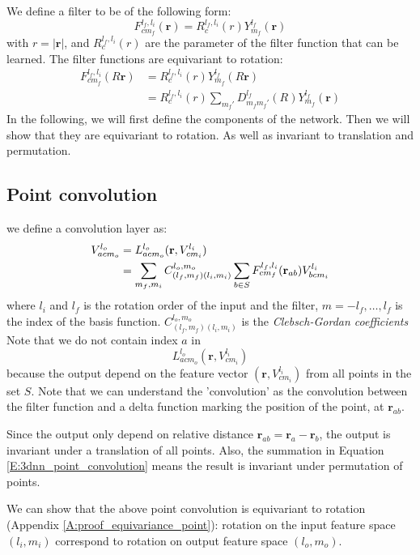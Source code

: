 \documentclass{article}
\begin{document}
We define a filter to be of the following form:
\begin{equation}
    F_{cm_f}^{l_f, l_i}(\mathbf{r}) =  R_c^{l_f, l_i} (r) Y_{m_f}^{l_f}(\mathbf{r})
\end{equation}
with $r = |\mathbf{r}|$, and $R_c^{l_f, l_i} (r)$ are the parameter of the filter function that can be learned.
The filter functions are equivariant to rotation:
\begin{align}
    F_{cm_f}^{l_f, l_i}(R\mathbf{r}) &= R_c^{l_f, l_i} (r) Y_{m_f}^{l_f}(R\mathbf{r}) \\
    &= R_c^{l_f, l_i} (r) \sum_{m_f'} D_{m_fm_f'}^{l_f}(R)  Y_{m_f}^{l_f}(\mathbf{r})
\end{align}
In the following, we will first define the components of the network.
Then we will show that they are equivariant to rotation. As well as 
invariant to translation and permutation.

\subsection*{Point convolution}
we define a convolution layer as:
\begin{align}
    V_{acm_o}^{l_o} &= L^{l_o}_{acm_o} (\mathbf{r}, V_{cm_i}^{l_i}) \notag\\
    &= \sum_{m_f, m_i} C^{l_o,m_o}_{(l_f, m_f)(l_i,m_i)} \sum_{b \in S} F_{cm_f}^{l_f, l_i}(\mathbf{r}_{ab}) V^{l_i}_{bcm_i} \label{E:3dnn_point_convolution}
\end{align}
where $l_i$ and $l_f$ is the rotation order of the input and the filter, $m = -l_f, \dots, l_f$ is the index of the basis function.
$C^{l_o,m_o}_{(l_f, m_f)(l_i,m_i)}$ is the \emph{Clebsch-Gordan coefficients}
Note that we do not contain index $a$ in \[L^{l_o}_{acm_o} (\mathbf{r}, V_{cm_i}^{l_i})\] because
the output depend on the feature vector $(\mathbf{r}, V_{cm_i}^{l_i})$ from all points in the set $S$.
Note that we can understand the 'convolution' as the convolution between the filter function and a delta function 
marking the position of the point, at $\mathbf{r}_{ab}$.

Since the output only depend on relative distance $\mathbf{r}_{ab} = \mathbf{r}_{a} - \mathbf{r}_{b} $, 
the output is invariant under a translation of all points. Also, the summation in Equation \eqref{E:3dnn_point_convolution}
means the result is invariant under permutation of points.

We can show that the above point convolution is equivariant to rotation (Appendix \ref{A:proof_equivariance_point}):
rotation on the input feature space $(l_i,m_i)$ 
correspond to rotation on output feature space $(l_o,m_o)$.
\end{document}
